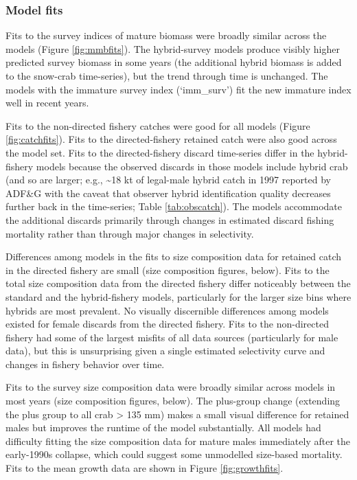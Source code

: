 \documentclass[
]{article}
\begin{document}
\subsubsection{Model fits}\label{model-fits}

Fits to the survey indices of mature biomass were broadly similar across the models (Figure \ref{fig:mmbfits}). The hybrid-survey models produce visibly higher predicted survey biomass in some years (the additional hybrid biomass is added to the snow-crab time-series), but the trend through time is unchanged. The models with the immature survey index (`imm\_surv') fit the new immature index well in recent years.

Fits to the non-directed fishery catches were good for all models (Figure \ref{fig:catchfits}). Fits to the directed-fishery retained catch were also good across the model set. Fits to the directed-fishery discard time-series differ in the hybrid-fishery models because the observed discards in those models include hybrid crab (and so are larger; e.g., \textasciitilde18 kt of legal-male hybrid catch in 1997 reported by ADF\&G with the caveat that observer hybrid identification quality decreases further back in the time-series; Table \ref{tab:obscatch}). The models accommodate the additional discards primarily through changes in estimated discard fishing mortality rather than through major changes in selectivity.

Differences among models in the fits to size composition data for retained catch in the directed fishery are small (size composition figures, below). Fits to the total size composition data from the directed fishery differ noticeably between the standard and the hybrid-fishery models, particularly for the larger size bins where hybrids are most prevalent. No visually discernible differences among models existed for female discards from the directed fishery. Fits to the non-directed fishery had some of the largest misfits of all data sources (particularly for male data), but this is unsurprising given a single estimated selectivity curve and changes in fishery behavior over time.

Fits to the survey size composition data were broadly similar across models in most years (size composition figures, below). The plus-group change (extending the plus group to all crab \textgreater{} 135 mm) makes a small visual difference for retained males but improves the runtime of the model substantially. All models had difficulty fitting the size composition data for mature males immediately after the early-1990s collapse, which could suggest some unmodelled size-based mortality. Fits to the mean growth data are shown in Figure \ref{fig:growthfits}.
\end{document}
